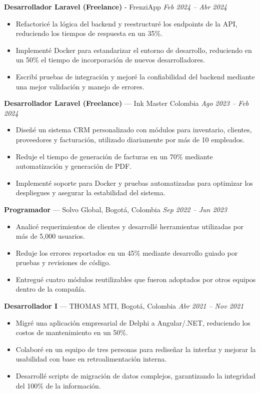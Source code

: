 \documentclass[10.5pt,letterpaper]{article}
\begin{document}
	\textbf{Desarrollador Laravel (Freelance)} - FrenziApp
	\hfill
	\textit{Feb 2024 – Abr 2024}
	\begin{itemize}
		\item Refactoricé la lógica del backend y reestructuré los endpoints de la API, reduciendo los tiempos de respuesta en un 35\%.
		\item Implementé Docker para estandarizar el entorno de desarrollo, reduciendo en un 50\% el tiempo de incorporación de nuevos desarrolladores.
		\item Escribí pruebas de integración y mejoré la confiabilidad del backend mediante una mejor validación y manejo de errores.
	\end{itemize}
	
	\textbf{Desarrollador Laravel (Freelance)} — Ink Master Colombia
	\hfill
	\textit{Ago 2023 – Feb 2024}
	\begin{itemize}
		\item Diseñé un sistema CRM personalizado con módulos para inventario, clientes, proveedores y facturación, utilizado diariamente por más de 10 empleados.
		\item Reduje el tiempo de generación de facturas en un 70\% mediante automatización y generación de PDF.
		\item Implementé soporte para Docker y pruebas automatizadas para optimizar los despliegues y asegurar la estabilidad del sistema.
	\end{itemize}
	
	\textbf{Programador} — Solvo Global, Bogotá, Colombia
	\hfill
	\textit{Sep 2022 – Jun 2023}
	\begin{itemize}
		\item Analicé requerimientos de clientes y desarrollé herramientas utilizadas por más de 5,000 usuarios.
		\item Reduje los errores reportados en un 45\% mediante desarrollo guiado por pruebas y revisiones de código.
		\item Entregué cuatro módulos reutilizables que fueron adoptados por otros equipos dentro de la compañía.
	\end{itemize}
	
	\textbf{Desarrollador I} — THOMAS MTI, Bogotá, Colombia
	\hfill
	\textit{Abr 2021 – Nov 2021}
	\begin{itemize}
		\item Migré una aplicación empresarial de Delphi a Angular/.NET, reduciendo los costos de mantenimiento en un 50\%.
		\item Colaboré en un equipo de tres personas para rediseñar la interfaz y mejorar la usabilidad con base en retroalimentación interna.
		\item Desarrollé scripts de migración de datos complejos, garantizando la integridad del 100\% de la información.
	\end{itemize}
	
\end{document}
